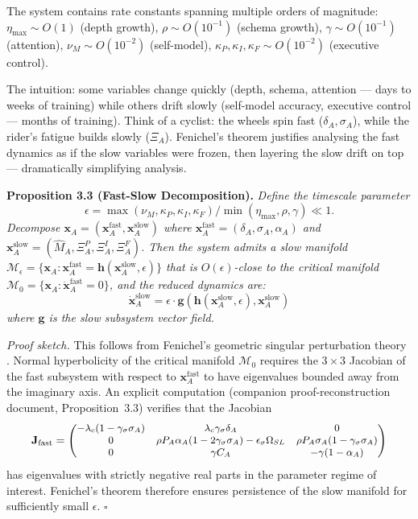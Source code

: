 The system contains rate constants spanning multiple orders of magnitude:
$\eta_{\max} \sim O(1)$ (depth growth), $\rho \sim O(10^{-1})$ (schema growth),
$\gamma \sim O(10^{-1})$ (attention), $\nu_M \sim O(10^{-2})$ (self-model),
$\kappa_P, \kappa_I, \kappa_F \sim O(10^{-2})$ (executive control).

The intuition: some variables change quickly (depth, schema, attention ---
days to weeks of training) while others drift slowly (self-model accuracy,
executive control --- months of training). Think of a cyclist: the wheels
spin fast ($\delta_A, \sigma_A$), while the rider's fatigue builds slowly
($\Xi_A$). Fenichel's theorem justifies analysing the fast dynamics as if
the slow variables were frozen, then layering the slow drift on top ---
dramatically simplifying analysis.

\textbf{Proposition 3.3 (Fast-Slow Decomposition).}
\textit{Define the timescale parameter}
\[
\epsilon = \max(\nu_M, \kappa_P, \kappa_I, \kappa_F) / \min(\eta_{\max}, \rho, \gamma) \ll 1.
\]
\textit{Decompose $\mathbf{x}_A = (\mathbf{x}_A^{\text{fast}}, \mathbf{x}_A^{\text{slow}})$
where $\mathbf{x}_A^{\text{fast}} = (\delta_A, \sigma_A, \alpha_A)$ and
$\mathbf{x}_A^{\text{slow}} = (\hat{M}_A, \Xi_A^P, \Xi_A^I, \Xi_A^F)$.
Then the system admits a slow manifold
$\mathcal{M}_\epsilon = \{\mathbf{x}_A : \mathbf{x}_A^{\text{fast}} = \mathbf{h}(\mathbf{x}_A^{\text{slow}}, \epsilon)\}$
that is $O(\epsilon)$-close to the critical manifold
$\mathcal{M}_0 = \{ \mathbf{x}_A : \dot{\mathbf{x}}_A^{\text{fast}} = 0 \}$, and the reduced dynamics are:
\begin{equation}\label{eq:reduced-dynamics}
\dot{\mathbf{x}}_A^{\text{slow}} = \epsilon \cdot \mathbf{g}(\mathbf{h}(\mathbf{x}_A^{\text{slow}}, \epsilon), \mathbf{x}_A^{\text{slow}})
\end{equation}
where $\mathbf{g}$ is the slow subsystem vector field.}

\textit{Proof sketch.} This follows from Fenichel's geometric singular
perturbation theory \citep{fenichel1979geometric}. Normal hyperbolicity
of the critical manifold $\mathcal{M}_0$ requires the $3\times3$ Jacobian
of the fast subsystem with respect to $\mathbf{x}_A^{\text{fast}}$ to have
eigenvalues bounded away from the imaginary axis. An explicit computation
(companion proof-reconstruction document, Proposition~3.3)
verifies that the Jacobian
\[
\small
\mathbf{J}_{\text{fast}} = 
\begin{pmatrix}
-\lambda_c(1-\gamma_\sigma\sigma_A) & \lambda_c\gamma_\sigma\delta_A & 0 \\
0 & \rho P_A\alpha_A(1-2\gamma_\sigma\sigma_A)-\epsilon_\sigma\Omega_{SL} & \rho P_A\sigma_A(1-\gamma_\sigma\sigma_A) \\
0 & \gamma C_A & -\gamma(1-\alpha_A)
\end{pmatrix}
\]
has eigenvalues with strictly negative real parts in the parameter regime
of interest. Fenichel's theorem therefore ensures persistence of the
slow manifold for sufficiently small $\epsilon$. $\square$


